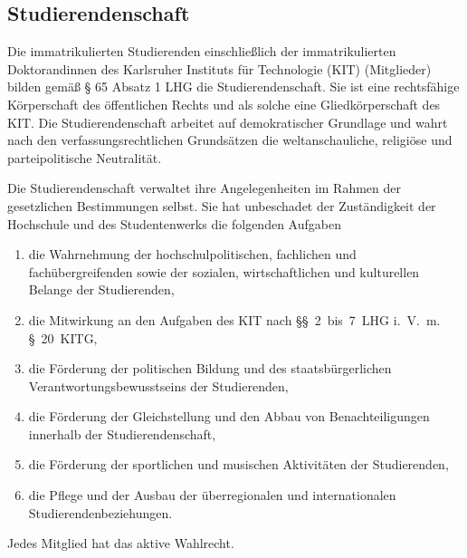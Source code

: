 %
%

\begin{contract}
\setcounter{Paragraph}{0}
\setcounter{juratoclevel}{1}


\parnumberfalse \section{Studierendenschaft} \parnumbertrue

\parnumberfalse Die immatrikulierten Studierenden einschließlich der immatrikulierten Doktorandinnen des Karlsruher Instituts für Technologie (KIT) (Mitglieder) bilden gemäß § 65 Absatz 1 LHG die Studierendenschaft. Sie ist eine rechtsfähige Körperschaft des öffentlichen Rechts und als solche eine Gliedkörperschaft des KIT. Die Studierendenschaft arbeitet auf demokratischer Grundlage und wahrt nach den verfassungsrechtlichen Grundsätzen die weltanschauliche, religiöse und parteipolitische Neutralität.\parnumbertrue

\label{studierendenschaft:aufgaben}

\parnumberfalse Die Studierendenschaft verwaltet ihre Angelegenheiten im Rahmen der gesetzlichen Bestimmungen selbst. Sie hat unbeschadet der Zuständigkeit der Hochschule und des Studentenwerks die folgenden Aufgaben
\begin{enumerate}
\item die Wahrnehmung der hochschulpolitischen, fachlichen und fachübergreifenden sowie der sozialen, wirtschaftlichen und kulturellen Belange der Studierenden,
\item die Mitwirkung an den Aufgaben des KIT nach §§~2~bis~7~LHG i.~V.~m. §~20~KITG,
\item die Förderung der politischen Bildung und des staatsbürgerlichen Verantwortungsbewusstseins der Studierenden,
\item die Förderung der Gleichstellung und den Abbau von Benachteiligungen innerhalb der Studierendenschaft,
\item die Förderung der sportlichen und musischen Aktivitäten der Studierenden,
\item die Pflege und der Ausbau der überregionalen und internationalen Studierendenbeziehungen.
\end{enumerate}\parnumbertrue

\label{studierendenschaft:mitglieder}

Jedes Mitglied hat das aktive Wahlrecht.


\end{contract}
